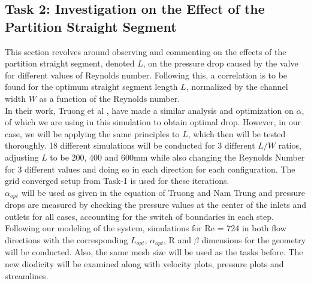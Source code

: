 \subsection{Task 2: Investigation on the Effect of the Partition Straight Segment}
\label{sec:task2_desc}

This section revolves around observing and commenting on the effects of the partition straight segment, denoted $L$, on the pressure drop caused by the valve for different values of Reynolds number. Following this,  a correlation is to be found for the optimum straight segment length $L$,
normalized by the channel width $W$ as a function of the Reynolds number. \\

In their work, Truong et al \cite{truong}, have made a similar analysis and optimization on $\alpha$, of which we are using in this simulation to obtain optimal drop. However, in our case, we will be applying the same principles to $L$, which then will be tested thoroughly. 18 different simulations will be conducted for 3 different $L/W$ ratios, adjusting $L$ to be 200, 400 and 600mm while also changing the Reynolds Number for 3 different values and doing so in each direction for each configuration. The grid converged setup from Task-1 is used for these iterations. \\

$\alpha_{opt}$ will be used as given in the equation of Truong and Nam Trung \cite{truong} and pressure drops are measured by checking the pressure values at the center of the inlets and outlets for all cases, accounting for the switch of boundaries in each step.\\

Following our modeling of the system, simulations for Re = 724 in both flow directions with the corresponding $L_{opt}$, $\alpha_{opt}$, R and $\beta$ dimensions for the geometry will be conducted. Also, the same mesh size will be used as the tasks before. The new diodicity will be examined along with velocity plots, pressure plots and streamlines.
